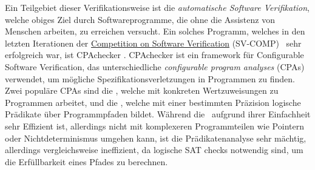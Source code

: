 Ein Teilgebiet dieser Verifikationsweise ist die \emph{automatische Software Verifikation}, welche obiges Ziel durch Softwareprogramme, die ohne die Assistenz von Menschen arbeiten, zu erreichen versucht.
Ein solches Programm, welches in den letzten Iterationen der \href{http://sv-comp.sosy-lab.org}{Competition on Software Verification} (SV-COMP) \cite{SV-COMP2013} \cite{SV-COMP2014} \cite{SV-COMP2015}\ sehr erfolgreich war, ist CPAchecker \cite{Beyer2011}.
CPAchecker ist ein framework f\"ur Configurable Software Verification\cite{Beyer2007}, das unterschiedliche \emph{configurable program analyses} (CPAs) verwendet, um m\"ogliche Spezifikationsverletzungen in Programmen zu finden.
Zwei popul\"are CPAs sind die  , welche mit konkreten Wertzuweisungen zu Programmen arbeitet, und die \predicateCPA , welche mit einer bestimmten Pr\"azision logische Pr\"adikate \"uber Programmpfaden bildet.
W\"ahrend die \ aufgrund ihrer Einfachheit sehr Effizient ist, allerdings nicht mit komplexeren Programmteilen wie Pointern oder Nichtdeterminismus umgehen kann, ist die Pr\"adikatenanalyse sehr m\"achtig, allerdings vergleichsweise ineffizient, da logische SAT checks notwendig sind, um die Erf\"ullbarkeit eines Pfades zu berechnen.


